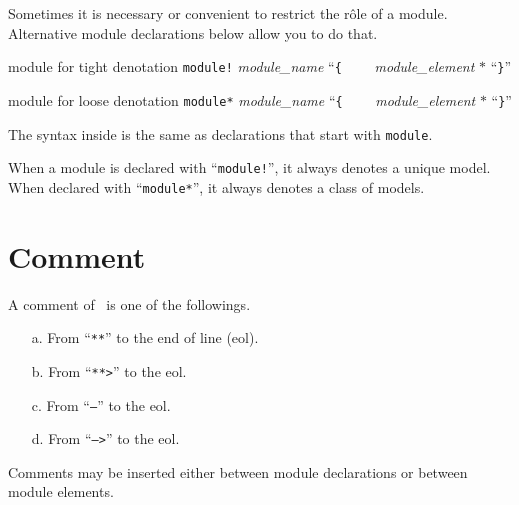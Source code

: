 \documentclass[a4paper]{memoir}
\begin{document}
Sometimes it is necessary or convenient to restrict the r{\^ o}le of
a module. Alternative module declarations below allow you to do that.

\begin{bsyntax} module for tight denotation \Hline
\texttt{module!} \textit{module\_name} ``\texttt{\{}
~~~~\textit{module\_element} $*$
``\texttt{\}}''
\end{bsyntax}

\begin{bsyntax} module for loose denotation \Hline
\texttt{module*} \textit{module\_name} ``\texttt{\{}
~~~~\textit{module\_element} $*$
``\texttt{\}}''
\end{bsyntax}

The syntax inside is the same as declarations that start
with \verb|module|.

When a module is declared with ``\verb|module!|'', it always denotes a
unique model. When declared with ``\verb|module*|'', it always denotes a
class of models.


\section{Comment}\label{sec:p2-comment-syntax}

A comment of \cafeobj~is one of the followings.
\begin{itemize}
\item[a.] From ``\texttt{**}'' to the end of line (eol).\index{\texttt{**}}
\item[b.] From ``\texttt{**>}'' to the eol.\index{\texttt{**>}}
\item[c.] From ``\texttt{--}'' to the eol.\index{\texttt{--}}
\item[d.] From ``\texttt{-->}'' to the eol.\index{\texttt{-->}}
\end{itemize}
Comments may be inserted either between module declarations or
between module elements.
\end{document}
